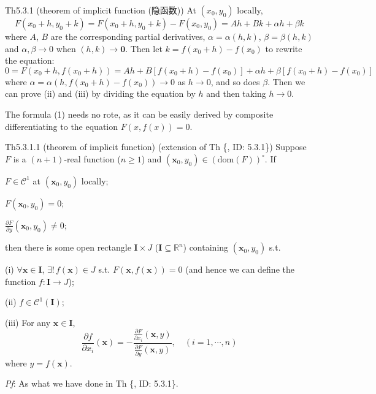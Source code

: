 \documentclass{article}
\newcommand{\parfrac}[2]{\frac{\partial #1}{\partial #2}}
\begin{document}
\begin{Th}{Th5.3.1 (theorem of implicit function (隐函数))}
    At $(x_0, y_0)$ locally,
    $$ F(x_0+h, y_0+k) = F(x_0+h, y_0+k) - F(x_0, y_0) = Ah + Bk + \alpha h+\beta k $$
    where $A$, $B$ are the corresponding partial derivatives, $\alpha = \alpha (h,k)$, $\beta = \beta (h,k)$ and $\alpha, \beta\rightarrow 0$ when $(h,k)\rightarrow\pmb{0}$. Then let $k = f(x_0+h)-f(x_0)$ to rewrite the equation:
    $$ 0 = F(x_0+h, f(x_0+h)) = Ah + B[f(x_0+h)-f(x_0)] + \alpha h+\beta [f(x_0+h)-f(x_0)] $$
    where $\alpha = \alpha (h, f(x_0+h)-f(x_0))\rightarrow 0$ as $h\rightarrow 0$, and so does $\beta$. Then we can prove (ii) and (iii) by dividing the equation by $h$ and then taking $h\rightarrow 0$.
\end{Th}

\begin{Rmk}{}
    The formula (1) needs no rote, as it can be easily derived by composite differentiating to the equation $F(x,f(x)) = 0$.
\end{Rmk}

\begin{Th}{Th5.3.1.1 (theorem of implicit function) (extension of Th \{, ID: 5.3.1\})}
    Suppose $F$ is a $(n+1)$-real function ($n\geq 1$) and $(\pmb{x}_0, y_0)\in (\text{dom}(F))^\circ$. If
    \begin{compactenum}
        \item $F\in\mathcal{C}^1$ at $(\pmb{x}_0, y_0)$ locally;
        \item $F(\pmb{x}_0, y_0) = 0$;
        \item $\parfrac{F}{y}(\pmb{x}_0, y_0)\neq 0$;
    \end{compactenum}
    then there is some open rectangle $\pmb{I}\times J$ ($\pmb{I}\subseteq\mathbb{R}^n$) containing $(\pmb{x}_0, y_0)$ s.t.
    \begin{compactenum}
        \item[(i)] $\forall \pmb{x}\in \pmb{I}$, $\exists!\, f(\pmb{x})\in J$ s.t. $F(\pmb{x}, f(\pmb{x})) = 0$ (and hence we can define the function $f: \pmb{I}\rightarrow J$);
        \item[(ii)] $f\in\mathcal{C}^1(\pmb{I})$;
        \item[(iii)] For any $\pmb{x}\in\pmb{I}$,
        $$ \parfrac{f}{x_i}(\pmb{x}) = -\frac{\parfrac{F}{x_i}(\pmb{x}, y)}{\parfrac{F}{y}(\pmb{x}, y)}, \quad (i=1, \cdots, n)$$
        where $y=f(\pmb{x})$.
    \end{compactenum}
    \tcblower
    \textit{Pf}: As what we have done in Th \{, ID: 5.3.1\}.
\end{Th}
\end{document}
